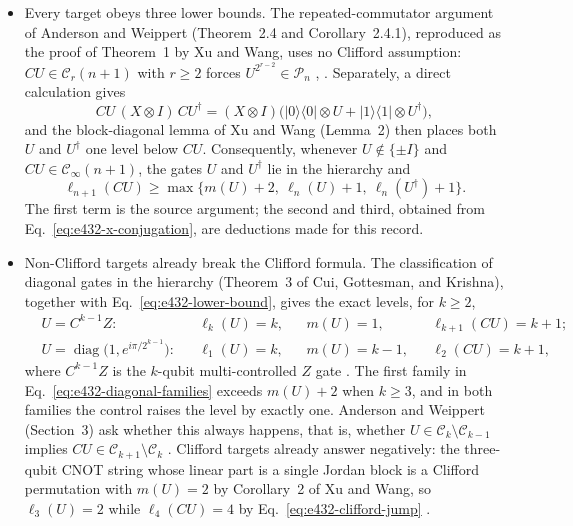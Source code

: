 \begin{itemize}
  \item Every target obeys three lower bounds.  The repeated-commutator argument
  of Anderson and Weippert (Theorem~2.4 and Corollary~2.4.1), reproduced as the
  proof of Theorem~1 by Xu and Wang, uses no Clifford assumption:
  $CU\in\mathcal C_r(n+1)$ with $r\geq2$ forces $U^{2^{r-2}}\in\mathcal P_n$
  ,
  .  Separately, a direct calculation gives
  \begin{equation}
    CU\,(X\otimes I)\,CU^\dagger
    =(X\otimes I)\bigl(|0\rangle\langle0|\otimes U
      +|1\rangle\langle1|\otimes U^\dagger\bigr),
    \label{eq:e432-x-conjugation}
  \end{equation}
  and the block-diagonal lemma of Xu and Wang (Lemma~2) then places both $U$
  and $U^\dagger$ one level below $CU$.  Consequently, whenever
  $U\notin\{\pm I\}$ and $CU\in\mathcal C_\infty(n+1)$, the gates $U$ and
  $U^\dagger$ lie in the hierarchy and
  \begin{equation}
    \ell_{n+1}(CU)\geq\max\bigl\{m(U)+2,\ \ell_n(U)+1,\
      \ell_n(U^\dagger)+1\bigr\}.
    \label{eq:e432-lower-bound}
  \end{equation}
  The first term is the source argument; the second and third, obtained from
  Eq.~\eqref{eq:e432-x-conjugation}, are deductions made for this record.

  \item Non-Clifford targets already break the Clifford formula.  The
  classification of diagonal gates in the hierarchy (Theorem~3 of Cui,
  Gottesman, and Krishna), together with Eq.~\eqref{eq:e432-lower-bound},
  gives the exact levels, for $k\geq2$,
  \begin{equation}
    \begin{aligned}
      &U=C^{k-1}Z: && \ell_k(U)=k, && m(U)=1, && \ell_{k+1}(CU)=k+1;\\
      &U=\operatorname{diag}\bigl(1,e^{i\pi/2^{k-1}}\bigr): && \ell_1(U)=k,
        && m(U)=k-1, && \ell_2(CU)=k+1,
    \end{aligned}
    \label{eq:e432-diagonal-families}
  \end{equation}
  where $C^{k-1}Z$ is the $k$-qubit multi-controlled $Z$ gate
  .  The first family in
  Eq.~\eqref{eq:e432-diagonal-families} exceeds $m(U)+2$ when $k\geq3$, and in
  both families the control raises the level by exactly one.  Anderson and
  Weippert (Section~3) ask whether this always happens, that is, whether
  $U\in\mathcal C_k\setminus\mathcal C_{k-1}$ implies
  $CU\in\mathcal C_{k+1}\setminus\mathcal C_k$
  .  Clifford targets already
  answer negatively: the three-qubit CNOT string whose linear part is a single
  Jordan block is a Clifford permutation with $m(U)=2$ by Corollary~2 of Xu and
  Wang, so $\ell_3(U)=2$ while $\ell_4(CU)=4$ by
  Eq.~\eqref{eq:e432-clifford-jump} .


\end{itemize}

